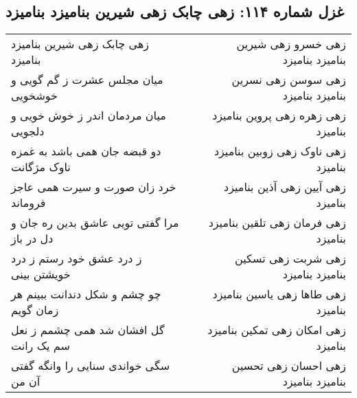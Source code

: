 \begin{center}
\section*{غزل شماره ۱۱۴: زهی چابک زهی شیرین بنامیزد بنامیزد}
\label{sec:114}
\begin{longtable}{l p{0.5cm} r}
زهی چابک زهی شیرین بنامیزد بنامیزد
&&
زهی خسرو زهی شیرین بنامیزد بنامیزد
\\
میان مجلس عشرت ز گم گویی و خوشخویی
&&
زهی سوسن زهی نسرین بنامیزد بنامیزد
\\
میان مردمان اندر ز خوش خویی و دلجویی
&&
زهی زهره زهی پروین بنامیزد بنامیزد
\\
دو قبضه جان همی باشد به غمزه ناوک مژگانت
&&
زهی ناوک زهی زوبین بنامیزد بنامیزد
\\
خرد زان صورت و سیرت همی عاجز فروماند
&&
زهی آیین زهی آذین بنامیزد بنامیزد
\\
مرا گفتی تویی عاشق بدین ره جان و دل در باز
&&
زهی فرمان زهی تلقین بنامیزد بنامیزد
\\
ز درد عشق خود رستم ز درد خویشتن بینی
&&
زهی شربت زهی تسکین بنامیزد بنامیزد
\\
چو چشم و شکل دندانت ببینم هر زمان گویم
&&
زهی طاها زهی یاسین بنامیزد بنامیزد
\\
گل افشان شد همی چشمم ز نعل سم یک رانت
&&
زهی امکان زهی تمکین بنامیزد بنامیزد
\\
سگی خواندی سنایی را وانگه گفتی آن من
&&
زهی احسان زهی تحسین بنامیزد بنامیزد
\\
\end{longtable}
\end{center}
